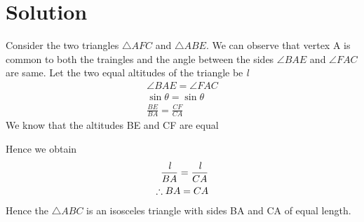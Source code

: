 \documentclass[journal,12pt,twocolumn]{IEEEtran}
\begin{document}
\section{Solution}
Consider the two triangles $\triangle{AFC}$ and $\triangle{ABE}$. We can observe that vertex A is common to both the traingles and the angle between the sides $\angle{BAE}$ and $\angle{FAC}$ are same.
Let the two equal altitudes of the triangle be \textit l
\begin{align}
\angle{BAE} = \angle{FAC}\\
\sin\theta = \sin\theta\\
\frac{BE}{BA}= \frac{CF}{CA} 
\end{align} 
We know that the altitudes BE and CF are equal

Hence we obtain
\begin{align}
\frac{\textit l}{BA}= \frac{\textit l}{CA} \\
\therefore BA = CA
\end{align}
Hence the  $\triangle{ABC}$ is an isosceles triangle with sides BA and CA of equal length.
\end{document}

